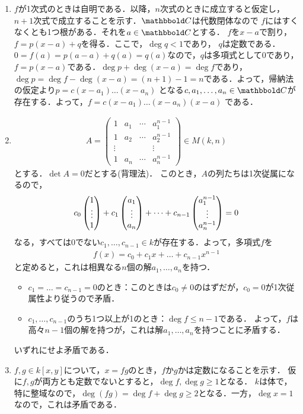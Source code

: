 \documentclass[9pt]{ltjsarticle}
\theoremstyle{break}
\theoremstyle{break}
\theoremstyle{break}
\theoremstyle{break}
\theoremstyle{break}
\theoremstyle{break}
\theoremstyle{break}
\theoremstyle{break}
\theoremstyle{break}
\theoremstyle{break}
\theoremstyle{break}
\theoremstyle{break}
\theoremstyle{break}
\theoremstyle{break}
\theoremstyle{break}
\theoremstyle{nonumberbreak}
\theoremstyle{nonumberbreak}
\begin{document}
\begin{enumerate}[label=(問題\arabic*)]
 \item
$f$が1次式のときは自明である．以降，$n$次式のときに成立すると仮定し，
$n+1$次式で成立することを示す．$\C$は代数閉体なので
$f$にはすくなくとも1つ根がある．それを$a\in \C$とする．
$f$を$x-a$で割り，$f=p(x-a)+ q$を得る．ここで，$\deg q < 1$であり，
$q$は定数である．$0=f(a)=p(a-a)+q(a)=q(a)$なので，$q$は多項式として0であり，
$f=p(x-a)$である．$\deg p + \deg(x-a) = \deg f$であり，$\deg p = \deg f - \deg (x-a)= (n+1)-1 = n$である．よって，帰納法の仮定より$p=c(x-a_1)\dots(x-a_n)$
となる$c,a_1,\dots,a_n\in \C$が存在する．よって，$f=c(x-a_1)\dots(x-a_n)(x-a)$
である．
 \item
\begin{align}
 A =
\begin{pmatrix}
 1 & a_1 & \cdots & a_1^{n-1}\\
 1&a_2 &\cdots & a_2^{n-1}\\
 \vdots& & & \vdots\\
 1&a_{n} &\cdots & a_n^{n-1}
\end{pmatrix}\in M(k,n)
\end{align}
とする．$\det A = 0$だとする(背理法)．
このとき，$A$の列たちは1次従属になるので，
\begin{align}
 c_0 \left(\begin{matrix}  1\\ \vdots \\ 1 \end{matrix}\right) + c_1\left(\begin{matrix} a_1 \\ \vdots \\ a_n \end{matrix}\right) + \dots + c_{n-1}\left(\begin{matrix} a_1^{n-1} \\ \vdots \\ a_n^{n-1} \end{matrix}\right) = 0
\end{align}
なる，すべては0でない$c_1,\dots,c_{n-1}\in k$が存在する．よって，多項式$f$を
\begin{align}
 f(x) = c_0 + c_1 x + \dots + c_{n-1}x^{n-1}
\end{align}
と定めると，これは相異なる$n$個の解$a_1,\dots,a_n$を持つ．
\begin{itemize}
 \item $c_1=\dots=c_{n-1}=0$のとき：このときは$c_0\neq 0$のはずだが，$c_0 = 0$が1次従属性より従うので矛盾．
 \item $c_1,\dots,c_{n-1}$のうち1つ以上が1のとき：$\deg f \le n-1$である．
よって，$f$は高々$n-1$個の解を持つが，これは解$a_1,\dots,a_n$を持つことに矛盾する．
\end{itemize}
いずれにせよ矛盾である．
 \item $f,g\in k[x,y]$について，$x=fg$のとき，$f$か$g$かは定数になることを示す．
仮に$f,g$が両方とも定数でないとすると，$\deg f, \deg g \ge 1$となる．
$k$は体で，特に整域なので，$\deg (fg)  = \deg f + \deg g \ge 2$となる．一方，$\deg x = 1$なので，これは矛盾である．


\end{enumerate}
\end{document}

